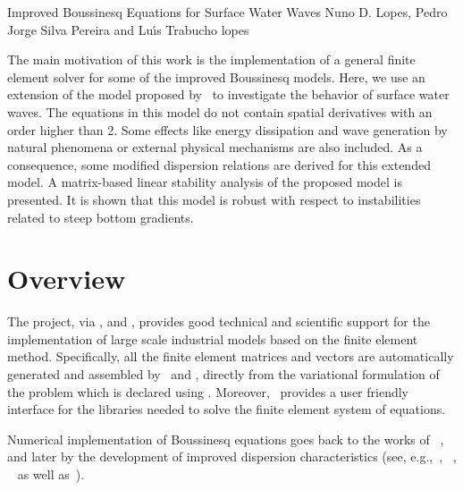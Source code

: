  {Improved Boussinesq Equations for Surface
  Water Waves} {Nuno D. Lopes, Pedro Jorge Silva Pereira and
  Lu{\'\i}s Trabucho} {lopes}


The main motivation of this work is the implementation of a
general finite element solver for some of the improved Boussinesq
models.  Here, we use an extension
of the model proposed by~\cite{ZhaoTengCheng2004} to
investigate the behavior of surface water waves. The
equations in this model do not contain spatial derivatives
with an order higher than 2. Some effects like
 energy dissipation and wave generation by natural
phenomena or external physical mechanisms are also included.
As a consequence, some modified dispersion relations are
derived for this extended model. A matrix-based linear
stability analysis of the proposed model is presented.
It is shown that this model is robust with respect to
instabilities related to steep bottom gradients.

\section{Overview}
The \fenics project, via \dolfin, \ufl and \ffc, provides
good technical and scientific support for the implementation
of large scale industrial models based on the finite element
method. Specifically, all the
finite element matrices and vectors are automatically
generated and assembled by \dolfin\ and \ffc, directly from
the variational formulation of the problem which is declared
using \ufl. Moreover, \dolfin\ provides a user friendly
interface for the libraries needed to solve the finite
element system of equations.

Numerical implementation of Boussinesq equations goes
back to the works of ~\cite{Peregrine1967}, ~\cite{Wu1981} and  later by the
development of improved dispersion characteristics
(see, e.g.,~\cite{MadsenEtAl1991},
~\cite{Nwogu1993}, ~\cite{ChenLiu1994}
as well as~\cite{BejiNadaoka1996}).

